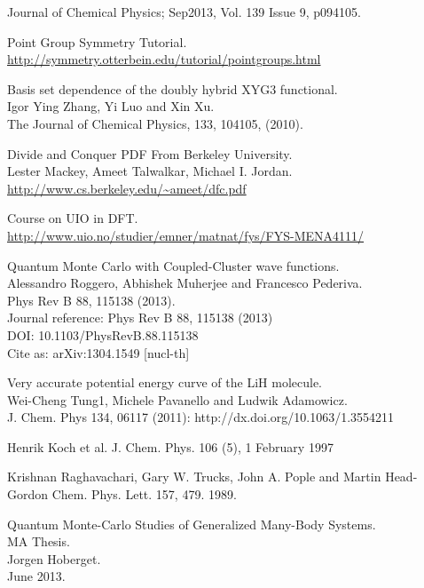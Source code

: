 \documentclass[a4paper,norsk,11pt,twoside]{report}
\begin{document}
\begin{thebibliography}{}
Journal of Chemical Physics; Sep2013, Vol. 139 Issue 9, p094105.

Point Group Symmetry Tutorial. \\
\url{http://symmetry.otterbein.edu/tutorial/pointgroups.html}

Basis set dependence of the doubly hybrid XYG3 functional. \\
Igor Ying Zhang, Yi Luo and Xin Xu. \\
The Journal of Chemical Physics, 133, 104105, (2010). 

Divide and Conquer PDF From Berkeley University. \\
Lester Mackey, Ameet Talwalkar, Michael I. Jordan. \\
\url{http://www.cs.berkeley.edu/~ameet/dfc.pdf}

Course on UIO in DFT. \\
\url{http://www.uio.no/studier/emner/matnat/fys/FYS-MENA4111/}

Quantum Monte Carlo with Coupled-Cluster wave functions. \\
Alessandro Roggero, Abhishek Muherjee and Francesco Pederiva. \\
Phys Rev B 88, 115138 (2013). \\
Journal reference: 	Phys Rev B 88, 115138 (2013) \\
DOI: 	10.1103/PhysRevB.88.115138 \\
Cite as: 	arXiv:1304.1549 [nucl-th]

Very accurate potential energy curve of the LiH molecule. \\
Wei-Cheng Tung1, Michele Pavanello and Ludwik Adamowicz. \\
J. Chem. Phys 134, 06117 (2011): http://dx.doi.org/10.1063/1.3554211

Henrik Koch et al. J. Chem. Phys. 106 (5), 1 February 1997

Krishnan Raghavachari, Gary W. Trucks, John A. Pople and Martin Head-Gordon
Chem. Phys. Lett. 157, 479. 1989.

Quantum Monte-Carlo Studies of Generalized Many-Body Systems. \\
MA Thesis. \\
Jorgen Hoberget.\\
June 2013.


\end{thebibliography}
\end{document}
